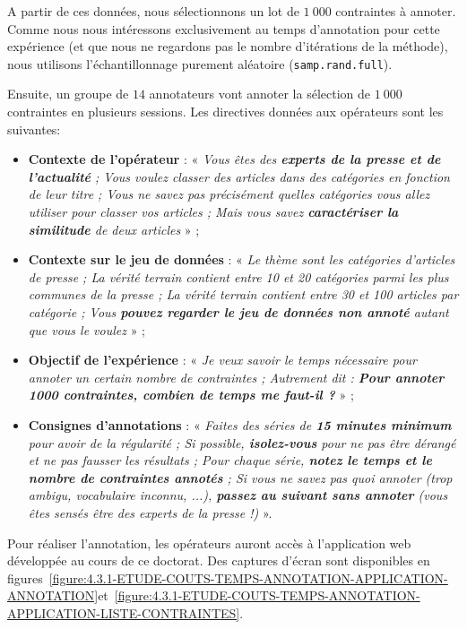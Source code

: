 			A partir de ces données, nous sélectionnons un lot de $1~000$ contraintes à annoter. Comme nous nous intéressons exclusivement au temps d'annotation pour cette expérience (et que nous ne regardons pas le nombre d'itérations de la méthode), nous utilisons l'échantillonnage purement aléatoire (\texttt{samp.rand.full}).			
			
			Ensuite, un groupe de $14$ annotateurs vont annoter la sélection de $1~000$ contraintes en plusieurs sessions.
			Les directives données aux opérateurs sont les suivantes:
			\begin{itemize}
				\item \textbf{Contexte de l'opérateur} :
				« \textit{Vous êtes des \textbf{experts de la presse et de l’actualité} ; Vous voulez classer des articles dans des catégories en fonction de leur titre ; Vous ne savez pas précisément quelles catégories vous allez utiliser pour classer vos articles ; Mais vous savez \textbf{caractériser la similitude} de deux articles} » ;
				\item \textbf{Contexte sur le jeu de données} :
				« \textit{Le thème sont les catégories d’articles de presse ; La vérité terrain contient entre 10 et 20 catégories parmi les plus communes de la presse ; La vérité terrain contient entre 30 et 100 articles par catégorie ; Vous \textbf{pouvez regarder le jeu de données non annoté} autant que vous le voulez} » ;
				\item \textbf{Objectif de l'expérience} :
				« \textit{Je veux savoir le temps nécessaire pour annoter un certain nombre de contraintes ; Autrement dit : \textbf{Pour annoter 1000 contraintes, combien de temps me faut-il ?}} » ;
				\item \textbf{Consignes d'annotations} :
				« \textit{Faites des séries de \textbf{15 minutes minimum} pour avoir de la régularité ; Si possible, \textbf{isolez-vous} pour ne pas être dérangé et ne pas fausser les résultats ; Pour chaque série, \textbf{notez le temps et le nombre de contraintes annotés} ; Si vous ne savez pas quoi annoter (trop ambigu, vocabulaire inconnu, ...), \textbf{passez au suivant sans annoter} (vous êtes sensés être des experts de la presse !)} ».
			\end{itemize}
			Pour réaliser l'annotation, les opérateurs auront accès à l'application web développée au cours de ce doctorat.
			Des captures d'écran sont disponibles en figures~\ref{figure:4.3.1-ETUDE-COUTS-TEMPS-ANNOTATION-APPLICATION-ANNOTATION}et~\ref{figure:4.3.1-ETUDE-COUTS-TEMPS-ANNOTATION-APPLICATION-LISTE-CONTRAINTES}.

